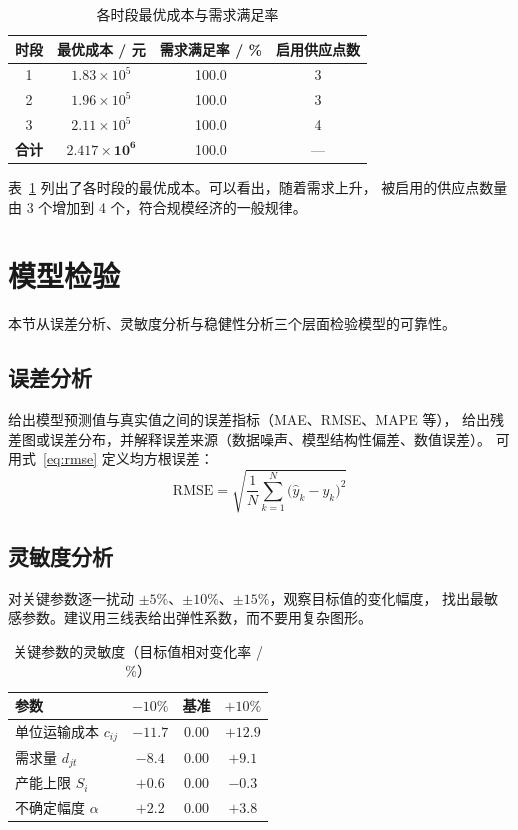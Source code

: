 \documentclass[12pt,a4paper]{ctexart}
\begin{document}
\begin{table}[htbp]
  \centering
  \caption{各时段最优成本与需求满足率}
  \label{tab:result}
  \begin{tabular}{cccc}
    \toprule
    \textbf{时段} & \textbf{最优成本 / 元} & \textbf{需求满足率 / \%} & \textbf{启用供应点数} \\
    \midrule
    1  & $1.83\times10^{5}$ & 100.0 & 3 \\
    2  & $1.96\times10^{5}$ & 100.0 & 3 \\
    3  & $2.11\times10^{5}$ & 100.0 & 4 \\
    \textbf{合计} & $\bm{2.417\times10^{6}}$ & 100.0 & --- \\
    \bottomrule
  \end{tabular}
\end{table}

表~\ref{tab:result} 列出了各时段的最优成本。可以看出，随着需求上升，
被启用的供应点数量由 3 个增加到 4 个，符合规模经济的一般规律。

\section{模型检验}
\label{sec:validation}

本节从误差分析、灵敏度分析与稳健性分析三个层面检验模型的可靠性。

\subsection{误差分析}

给出模型预测值与真实值之间的误差指标（MAE、RMSE、MAPE 等），
给出残差图或误差分布，并解释误差来源（数据噪声、模型结构性偏差、数值误差）。
可用式~\eqref{eq:rmse} 定义均方根误差：
\begin{equation}
  \mathrm{RMSE}=\sqrt{\frac{1}{N}\sum_{k=1}^{N}\bigl(\hat{y}_k-y_k\bigr)^2}
  \label{eq:rmse}
\end{equation}

\subsection{灵敏度分析}

对关键参数逐一扰动 $\pm 5\%$、$\pm 10\%$、$\pm 15\%$，观察目标值的变化幅度，
找出最敏感参数。建议用三线表给出弹性系数，而不要用复杂图形。

\begin{table}[htbp]
  \centering
  \caption{关键参数的灵敏度（目标值相对变化率 / \%）}
  \label{tab:sensitivity}
  \begin{tabular}{lccc}
    \toprule
    \textbf{参数} & \textbf{$-10\%$} & \textbf{基准} & \textbf{$+10\%$} \\
    \midrule
    单位运输成本 $c_{ij}$ & $-11.7$ & $0.00$ & $+12.9$ \\
    需求量 $d_{jt}$       & $-8.4$  & $0.00$ & $+9.1$  \\
    产能上限 $S_i$        & $+0.6$  & $0.00$ & $-0.3$  \\
    不确定幅度 $\alpha$   & $+2.2$  & $0.00$ & $+3.8$  \\
    \bottomrule
  \end{tabular}
\end{table}
\end{document}
